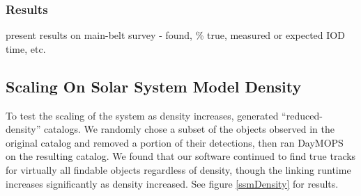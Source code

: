 \documentclass[12pt,preprint]{aastex}
\begin{document}

\subsubsection{Results}



present results on main-belt survey - found, \% true, measured or expected IOD time, etc.

\subsection{Scaling On Solar System Model Density}

To test the scaling of the system as density increases, generated
``reduced-density'' catalogs.  We randomly chose a subset of the
objects observed in the original catalog and removed a portion of
their detections, then ran DayMOPS on the resulting catalog.  We found
that our software continued to find true tracks for virtually all
findable objects regardless of density, though the linking runtime
increases significantly as density increased. See figure
\ref{ssmDensity} for results.
\end{document}
